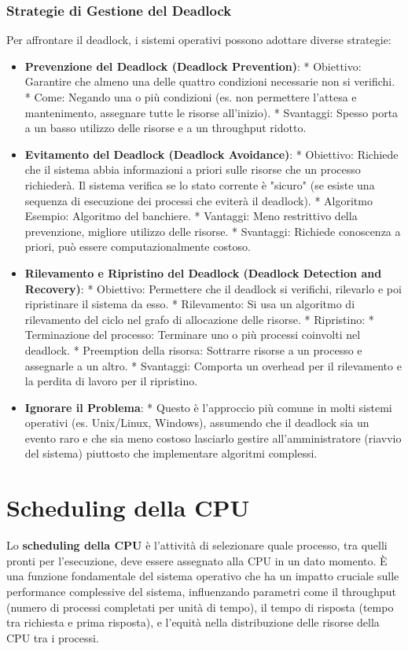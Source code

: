 \subsubsection{Strategie di Gestione del Deadlock}
Per affrontare il deadlock, i sistemi operativi possono adottare diverse strategie:
\begin{itemize}
    \item \textbf{Prevenzione del Deadlock (Deadlock Prevention)}:
        * Obiettivo: Garantire che almeno una delle quattro condizioni necessarie non si verifichi.
        * Come: Negando una o più condizioni (es. non permettere l'attesa e mantenimento, assegnare tutte le risorse all'inizio).
        * Svantaggi: Spesso porta a un basso utilizzo delle risorse e a un throughput ridotto.
    \item \textbf{Evitamento del Deadlock (Deadlock Avoidance)}:
        * Obiettivo: Richiede che il sistema abbia informazioni a priori sulle risorse che un processo richiederà. Il sistema verifica se lo stato corrente è "sicuro" (se esiste una sequenza di esecuzione dei processi che eviterà il deadlock).
        * Algoritmo Esempio: Algoritmo del banchiere.
        * Vantaggi: Meno restrittivo della prevenzione, migliore utilizzo delle risorse.
        * Svantaggi: Richiede conoscenza a priori, può essere computazionalmente costoso.
    \item \textbf{Rilevamento e Ripristino del Deadlock (Deadlock Detection and Recovery)}:
        * Obiettivo: Permettere che il deadlock si verifichi, rilevarlo e poi ripristinare il sistema da esso.
        * Rilevamento: Si usa un algoritmo di rilevamento del ciclo nel grafo di allocazione delle risorse.
        * Ripristino:
            * Terminazione del processo: Terminare uno o più processi coinvolti nel deadlock.
            * Preemption della risorsa: Sottrarre risorse a un processo e assegnarle a un altro.
        * Svantaggi: Comporta un overhead per il rilevamento e la perdita di lavoro per il ripristino.
    \item \textbf{Ignorare il Problema}:
        * Questo è l'approccio più comune in molti sistemi operativi (es. Unix/Linux, Windows), assumendo che il deadlock sia un evento raro e che sia meno costoso lasciarlo gestire all'amministratore (riavvio del sistema) piuttosto che implementare algoritmi complessi.
\end{itemize}

\section{Scheduling della CPU}
Lo \textbf{scheduling della CPU} è l'attività di selezionare quale processo, tra quelli pronti per l'esecuzione, deve essere assegnato alla CPU in un dato momento. È una funzione fondamentale del sistema operativo che ha un impatto cruciale sulle performance complessive del sistema, influenzando parametri come il throughput (numero di processi completati per unità di tempo), il tempo di risposta (tempo tra richiesta e prima risposta), e l'equità nella distribuzione delle risorse della CPU tra i processi.

